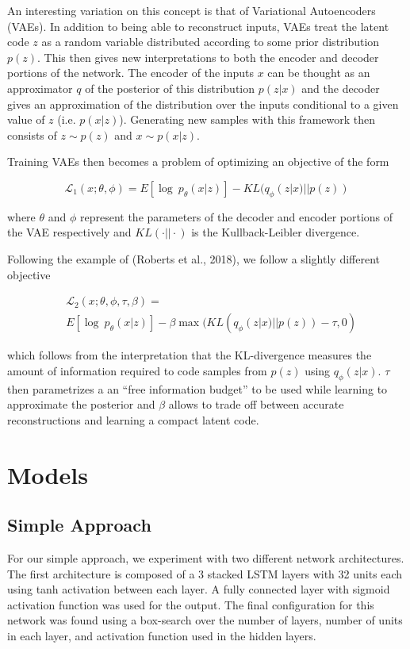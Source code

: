 \documentclass[10pt,twocolumn]{article}
\begin{document}
An interesting variation on this concept is that of Variational Autoencoders (VAEs). In addition to being able to reconstruct inputs, VAEs treat the latent code $z$ as a random variable distributed according to some prior distribution $p(z)$. This then gives new interpretations to both the encoder and decoder portions of the network. The encoder of the inputs $x$ can be thought as an approximator $q$ of the posterior of this distribution $p(z | x)$ and the decoder gives an approximation of the distribution over the inputs conditional to a given value of $z$ (i.e. $p(x | z)$). Generating new samples with this framework then consists of $z \sim p(z)$ and $x \sim p(x | z)$.

Training VAEs then becomes a problem of optimizing an objective of the form 

\[
  \mathcal{L}_1(x; \theta, \phi) = E[\log ~ p_\theta (x | z)] - KL(q_\phi(z | x) || p(z))
\]

where $\theta$ and $\phi$ represent the parameters of the decoder and encoder portions of the VAE respectively and $KL(\cdot || \cdot)$ is the Kullback-Leibler divergence.

Following the example of (Roberts et al., 2018), we follow a slightly different objective 

\begin{align*}
  & \mathcal{L}_2(x; \theta, \phi, \tau, \beta) = \\
   & E[\log ~ p_\theta (x | z)] - \beta \max(KL(q_\phi(z | x) || p(z)) - \tau, 0)
\end{align*}

which follows from the interpretation that the KL-divergence measures the amount of information required to code samples from $p(z)$ using $q_\phi(z | x)$. $\tau$ then parametrizes a an ``free information budget'' to be used while learning to approximate the posterior and $\beta$ allows to trade off between accurate reconstructions and learning a compact latent code.

\section{Models}
\subsection{Simple Approach}
For our simple approach, we experiment with two different network architectures. The first architecture is composed of a 3 stacked LSTM layers with 32 units each using tanh activation between each layer. A fully connected layer with sigmoid activation function was used for the output. The final configuration for this network was found using a box-search over the number of layers, number of units in each layer, and activation function used in the hidden layers.
\end{document}
